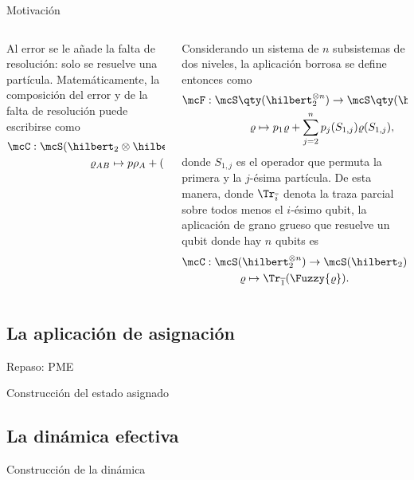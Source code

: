 \begin{frame}{Motivación}
    \begin{columns}
        \begin{column}
            Al error se le añade la falta de resolución: solo se resuelve una partícula. Matemáticamente, la composición del error y de la falta de resolución puede escribirse como
            \begin{gather}
                \mcC:\mcS(\hilbert_2 \otimes \hilbert_2)\to \mcS(\hilbert_2)\nonumber\\
                \varrho_{AB} \mapsto p\rho_A+(1-p)\rho_B\rlap{,}\nonumber
            \end{gather}
        \end{column}
        \begin{column}
            Considerando un sistema de $n$ subsistemas de dos niveles, la aplicación borrosa se define entonces como
\begin{gather}
    \mcF:\mcS\qty( \hilbert_{2}^{\otimes n})\to \mcS\qty( \hilbert_{2}^{\otimes n})\nonumber\\
    \varrho \mapsto p_{1}\varrho+\sum_{j=2}^{n}p_{j}(S_{1,j})\varrho(S_{1,j}),\nonumber
\end{gather}
donde $S_{1,j}$ es el operador que permuta la primera y la $j$-ésima partícula. De esta manera, donde $\Tr_{\overline{i}}$ denota la traza parcial sobre todos menos el $i$-ésimo qubit, la aplicación de grano grueso que resuelve un qubit donde hay $n$ qubits es
\begin{equation}
    \begin{gathered}
        \mcC:\mcS( \hilbert_{2}^{\otimes n})\to \mcS(\hilbert_{2})\\
        \varrho\mapsto\Tr_{\overline{1}}(\Fuzzy{\varrho}).
    \end{gathered}
\end{equation}
        \end{column}
    \end{columns}
\end{frame}
\fi

\subsection{La aplicación de asignación}
\begin{frame}{Repaso: PME}
    \lipsum[1]
\end{frame}

\begin{frame}{Construcción del estado asignado}
    \lipsum[1]
\end{frame}


\subsection{La dinámica efectiva}
\begin{frame}{Construcción de la dinámica}
    \lipsum[1]
\end{frame}
